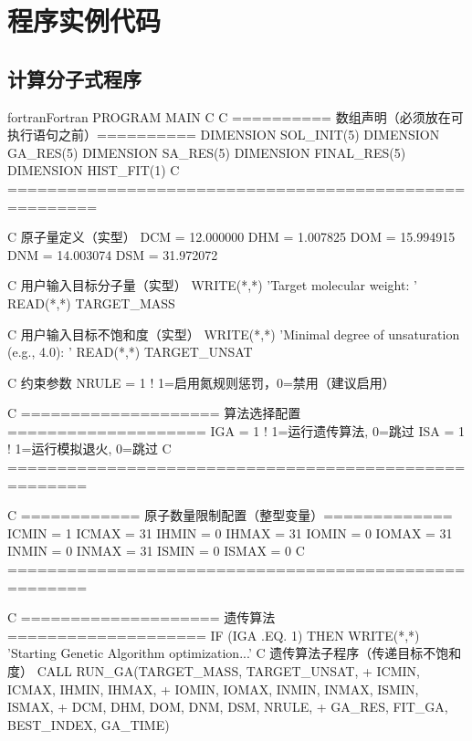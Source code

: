 \section{程序实例代码}
\label{sec:code}

\subsection{计算分子式程序}
\label{subsec:mcal}

\begin{envcode}{fortran}{Fortran}
      PROGRAM MAIN
C     
C     ========== 数组声明（必须放在可执行语句之前）==========
      DIMENSION SOL_INIT(5)
      DIMENSION GA_RES(5)
      DIMENSION SA_RES(5)
      DIMENSION FINAL_RES(5)
      DIMENSION HIST_FIT(1)
C     =======================================================
      
C     原子量定义（实型）
      DCM = 12.000000
      DHM = 1.007825
      DOM = 15.994915
      DNM = 14.003074
      DSM = 31.972072
      
C     用户输入目标分子量（实型）
      WRITE(*,*) 'Target molecular weight: '
      READ(*,*) TARGET_MASS
      
C     用户输入目标不饱和度（实型）
      WRITE(*,*) 'Minimal degree of unsaturation (e.g., 4.0): '
      READ(*,*) TARGET_UNSAT
      
C     约束参数
      NRULE = 1          ! 1=启用氮规则惩罚，0=禁用（建议启用）
      
C     ==================== 算法选择配置 ====================
      IGA = 1            ! 1=运行遗传算法, 0=跳过
      ISA = 1            ! 1=运行模拟退火, 0=跳过
C     ======================================================
      
C     ============ 原子数量限制配置（整型变量）=============
      ICMIN = 1
      ICMAX = 31
      IHMIN = 0
      IHMAX = 31
      IOMIN = 0
      IOMAX = 31
      INMIN = 0
      INMAX = 31
      ISMIN = 0
      ISMAX = 0
C     ======================================================
      
C     ==================== 遗传算法 ====================
      IF (IGA .EQ. 1) THEN
          WRITE(*,*) 'Starting Genetic Algorithm optimization...'
C         遗传算法子程序（传递目标不饱和度）
          CALL RUN_GA(TARGET_MASS, TARGET_UNSAT,
     +                ICMIN, ICMAX, IHMIN, IHMAX,
     +                IOMIN, IOMAX, INMIN, INMAX, ISMIN, ISMAX,
     +                DCM, DHM, DOM, DNM, DSM, NRULE,
     +                GA_RES, FIT_GA, BEST_INDEX, GA_TIME)
          

\end{envcode}
